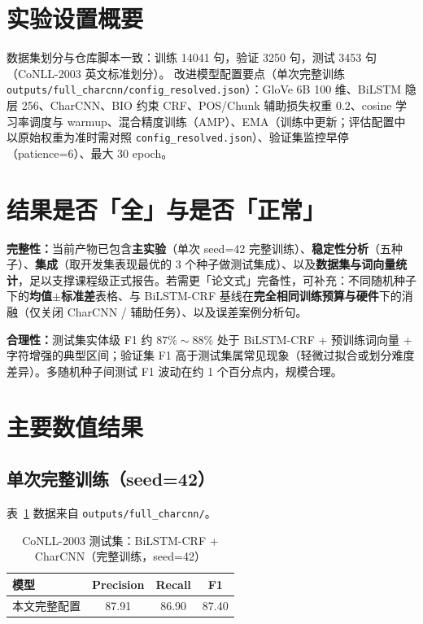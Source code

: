 \documentclass[UTF8,a4paper]{ctexart}
\begin{document}
\section{实验设置概要}

数据集划分与仓库脚本一致：训练 14041 句，验证 3250 句，测试 3453 句（CoNLL-2003 英文标准划分）。
改进模型配置要点（单次完整训练 \texttt{outputs/full\_charcnn/config\_resolved.json}）：GloVe 6B 100 维、BiLSTM 隐层 256、CharCNN、BIO 约束 CRF、POS/Chunk 辅助损失权重 $0.2$、cosine 学习率调度与 warmup、混合精度训练（AMP）、EMA（训练中更新；评估配置中以原始权重为准时需对照 \texttt{config\_resolved.json}）、验证集监控早停（patience=6）、最大 30 epoch。

\section{结果是否「全」与是否「正常」}

\textbf{完整性：}当前产物已包含\textbf{主实验}（单次 seed=42 完整训练）、\textbf{稳定性分析}（五种子）、\textbf{集成}（取开发集表现最优的 3 个种子做测试集成）、以及\textbf{数据集与词向量统计}，足以支撑课程级正式报告。若需更「论文式」完备性，可补充：不同随机种子下的\textbf{均值$\pm$标准差}表格、与 BiLSTM-CRF 基线在\textbf{完全相同训练预算与硬件}下的消融（仅关闭 CharCNN / 辅助任务）、以及误差案例分析句。

\textbf{合理性：}测试集实体级 F1 约 $87\%\sim88\%$ 处于 BiLSTM-CRF + 预训练词向量 + 字符增强的典型区间；验证集 F1 高于测试集属常见现象（轻微过拟合或划分难度差异）。多随机种子间测试 F1 波动在约 1 个百分点内，规模合理。

\section{主要数值结果}

\subsection{单次完整训练（seed=42）}
表~\ref{tab:single} 数据来自 \texttt{outputs/full\_charcnn/}。

\begin{table}[htbp]
  \centering
  \caption{CoNLL-2003 测试集：BiLSTM-CRF + CharCNN（完整训练，seed=42）}
  \label{tab:single}
  \begin{tabular}{lccc}
    \toprule
    模型 & Precision & Recall & F1 \\
    \midrule
    本文完整配置 & 87.91 & 86.90 & 87.40 \\
    \bottomrule
  \end{tabular}
\end{table}
\end{document}

